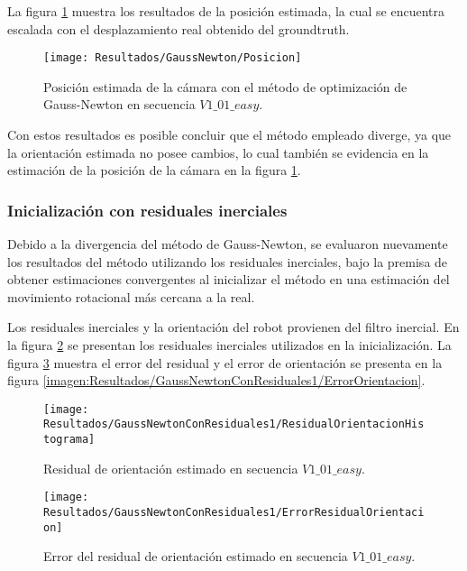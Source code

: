  La figura \ref{imagen:Resultados/GaussNewton/Posicion} muestra los resultados de la posición estimada, la cual se encuentra escalada con el desplazamiento real obtenido del groundtruth. 
 

\begin{figure}[H]
	\centering
	\texttt{[image: Resultados/GaussNewton/Posicion]}
	\caption{Posición estimada de la cámara con el método de optimización de Gauss-Newton en secuencia $V1\_ 01\_ easy$. }
	\label{imagen:Resultados/GaussNewton/Posicion}
\end{figure}

Con estos resultados es posible concluir que el método empleado diverge, ya que la orientación estimada no posee cambios, lo cual también se evidencia en la estimación de la posición de la cámara  en la figura \ref{imagen:Resultados/GaussNewton/Posicion}.

\subsubsection{Inicialización con residuales inerciales}
Debido a la divergencia del método de Gauss-Newton, se evaluaron nuevamente los resultados del método utilizando los residuales inerciales,  bajo la premisa de obtener estimaciones convergentes al inicializar el método en una estimación del movimiento rotacional más cercana a la real.

Los residuales inerciales y la orientación del robot provienen del filtro inercial. En la figura \ref{imagen:Resultados/GaussNewtonConResiduales1/ResidualOrientacionHistograma} se presentan los residuales inerciales utilizados en la inicialización. La figura \ref{imagen:Resultados/GaussNewtonConResiduales1/ErrorResidualOrientacion} muestra el error del residual y el error de orientación  se presenta en la figura \ref{imagen:Resultados/GaussNewtonConResiduales1/ErrorOrientacion}.

\begin{figure}[H]
	\centering
	\texttt{[image: Resultados/GaussNewtonConResiduales1/ResidualOrientacionHistograma]}
	\caption{ Residual de orientación estimado en secuencia $V1\_ 01\_ easy$.}
	\label{imagen:Resultados/GaussNewtonConResiduales1/ResidualOrientacionHistograma}
\end{figure}

\begin{figure}[H]
	\centering
	\texttt{[image: Resultados/GaussNewtonConResiduales1/ErrorResidualOrientacion]}
	\caption{ Error del residual de orientación estimado en secuencia $V1\_ 01\_ easy$.}
	\label{imagen:Resultados/GaussNewtonConResiduales1/ErrorResidualOrientacion}
\end{figure}

